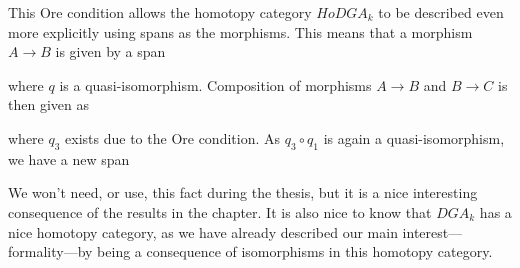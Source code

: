 This Ore condition allows the homotopy category $HoDGA_k$ to be described even more explicitly using spans as the morphisms. This means that a morphism $A\longrightarrow B$ is given by a span
\begin{center}
\end{center}
where $q$ is a quasi-isomorphism. Composition of morphisms $A\longrightarrow B$ and $B\longrightarrow C$ is then given as
\begin{center}
\end{center}
where $q_3$ exists due to the Ore condition. As $q_3\circ q_1$ is again a quasi-isomorphism, we have a new span
\begin{center}
\end{center}

We won't need, or use, this fact during the thesis, but it is a nice interesting consequence of the results in the chapter. It is also nice to know that $DGA_k$ has a nice homotopy category, as we have already described our main interest---formality---by being a consequence of isomorphisms in this homotopy category. 



